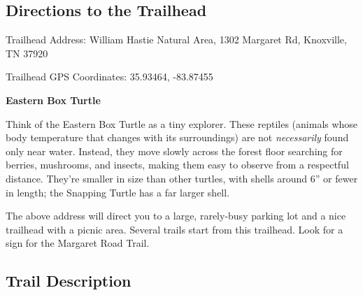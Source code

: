 \documentclass[
  letterpaper,
  DIV=11,
  numbers=noendperiod]{scrreprt}
\begin{document}
\subsection{Directions to the
Trailhead}\label{directions-to-the-trailhead-8}

Trailhead Address: William Hastie Natural Area, 1302 Margaret Rd,
Knoxville, TN 37920

Trailhead GPS Coordinates: 35.93464, -83.87455

\begin{tcolorbox}[enhanced jigsaw, opacityback=0, bottomrule=.15mm, colframe=quarto-callout-note-color-frame, breakable, arc=.35mm, leftrule=.75mm, rightrule=.15mm, toprule=.15mm, left=2mm, colback=white]
\begin{minipage}[t]{5.5mm}
\textcolor{quarto-callout-note-color}{\faInfo}
\end{minipage}%
\begin{minipage}[t]{\textwidth - 5.5mm}

\vspace{-3mm}\textbf{Eastern Box Turtle}\vspace{3mm}

Think of the Eastern Box Turtle as a tiny explorer. These reptiles
(animals whose body temperature that changes with its surroundings) are
not \emph{necessarily} found only near water. Instead, they move slowly
across the forest floor searching for berries, mushrooms, and insects,
making them easy to observe from a respectful distance. They're smaller
in size than other turtles, with shells around 6'' or fewer in length;
the Snapping Turtle has a far larger shell.

\end{minipage}%
\end{tcolorbox}

The above address will direct you to a large, rarely-busy parking lot
and a nice trailhead with a picnic area. Several trails start from this
trailhead. Look for a sign for the Margaret Road Trail.

\subsection{Trail Description}\label{trail-description-8}
\end{document}
